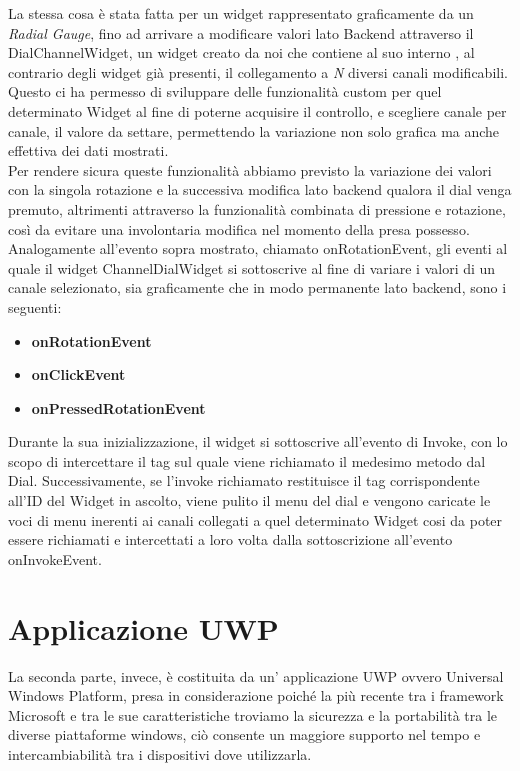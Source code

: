 La stessa cosa è stata fatta per un widget rappresentato graficamente da un \emph{Radial Gauge}, fino ad arrivare a modificare valori lato Backend attraverso il DialChannelWidget, un widget creato da noi che contiene al suo interno , al contrario degli widget già presenti, il collegamento a \emph{N} diversi canali modificabili.
Questo ci ha permesso di sviluppare delle funzionalità custom per quel determinato Widget al fine di poterne acquisire il controllo, e scegliere canale per canale, il valore da settare, permettendo la variazione non solo grafica ma anche effettiva dei dati mostrati.\\

Per rendere sicura queste funzionalità abbiamo previsto la variazione dei valori con la singola rotazione e la successiva modifica lato backend qualora il dial venga premuto, altrimenti attraverso la funzionalità combinata di pressione e rotazione, così da evitare una involontaria modifica nel momento della presa possesso.\\

Analogamente all'evento sopra mostrato, chiamato onRotationEvent, gli eventi al quale il widget ChannelDialWidget si sottoscrive al fine di variare i valori di un canale selezionato, sia graficamente che in modo permanente lato backend, sono i seguenti:

\begin{itemize}
\item \textbf{onRotationEvent} 
\item \textbf{onClickEvent} 
\item \textbf{onPressedRotationEvent}
\end{itemize}

Durante la sua inizializzazione, il widget si sottoscrive all'evento di Invoke, con lo scopo di intercettare il tag sul quale viene richiamato il medesimo metodo dal Dial. Successivamente, se l'invoke richiamato restituisce il tag corrispondente all'ID del Widget in ascolto, viene pulito il menu del dial e vengono caricate le voci di menu inerenti ai canali collegati a quel determinato Widget cosi da poter essere richiamati e intercettati a loro volta dalla sottoscrizione all'evento onInvokeEvent.
 
\section{Applicazione UWP}

La seconda parte, invece, è costituita da un’ applicazione UWP ovvero Universal Windows Platform, presa in considerazione poiché la più recente tra i framework Microsoft e tra le sue caratteristiche troviamo la sicurezza e la portabilità tra le diverse piattaforme windows, ciò consente un maggiore supporto nel tempo e intercambiabilità tra i dispositivi dove utilizzarla.\\

